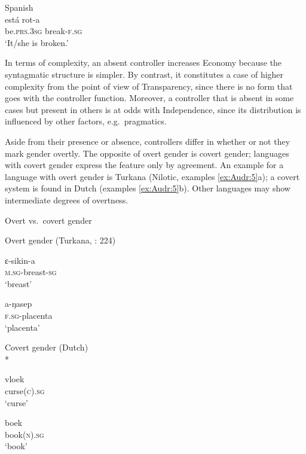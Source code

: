 \documentclass[output=collectionpaper]{langsci/langscibook}
\begin{document}
\ea
\label{ex:Audr:4}
Spanish\\
\gll está rot-a\\
     be.\textsc{prs}.\textsc{3sg} break-\textsc{f.sg}\\
\glt `It/she is broken.'
\z

In terms of complexity, an absent controller increases Economy because the syntagmatic structure is simpler. By contrast, it constitutes a case of higher complexity from the point of view of Transparency, since there is no form that goes with the controller function. Moreover, a controller that is absent in some cases but present in others is at odds with Independence, since its distribution is influenced by other factors, e.g.\ pragmatics.

Aside from their presence or absence, controllers differ in whether or not they mark gender overtly. The opposite of overt gender is covert gender; languages with covert gender express the feature only by agreement. An example for a language with overt gender is Turkana (Nilotic, examples \ref{ex:Audr:5}a); a covert system is found in Dutch (examples \ref{ex:Audr:5}b). Other languages may show intermediate degrees of overtness.

\ea
\label{ex:Audr:5}
Overt vs.\ covert gender\\
\begin{xlist}
\ex
Overt gender (Turkana, \citealt{Dimmendaal1983}: 224)\\
\begin{minipage}[t]{0.4\textwidth}
\gll ɛ{}-sikin-a  \\
     \textsc{m.sg}{}-breast-\textsc{sg}\\
\glt `breast'\\
\end{minipage}%
\begin{minipage}[t]{0.4\textwidth}
\gll a-ŋasep\\
     \textsc{f.sg-}placenta\\
\glt `placenta'\\
\end{minipage}
\goodbreak
\ex
Covert gender (Dutch)\\*
\begin{minipage}[t]{0.4\textwidth}
\gll vloek    \\
     curse(\textsc{c).sg}\\
\glt `curse'
\end{minipage}%
\begin{minipage}[t]{0.4\textwidth}
\gll boek\\
     book(\textsc{n).sg}\\
\glt `book'
\end{minipage}
\end{xlist}
\z
\end{document}
